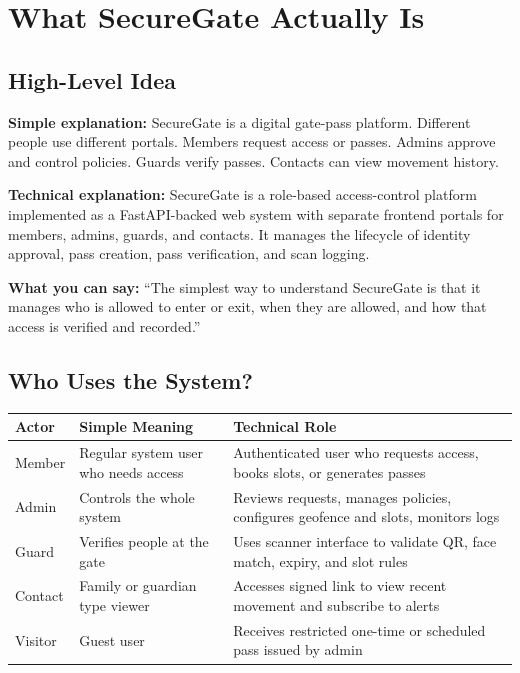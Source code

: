 \documentclass[12pt,letterpaper]{article}
\newcommand{\simple}[1]{\textbf{Simple explanation:} #1}
\newcommand{\technical}[1]{\textbf{Technical explanation:} #1}
\newcommand{\say}[1]{\textbf{What you can say:} ``#1''}
\begin{document}
\section{What SecureGate Actually Is}

\subsection{High-Level Idea}

\simple{SecureGate is a digital gate-pass platform. Different people use different portals. Members request access or passes. Admins approve and control policies. Guards verify passes. Contacts can view movement history.}

\technical{SecureGate is a role-based access-control platform implemented as a FastAPI-backed web system with separate frontend portals for members, admins, guards, and contacts. It manages the lifecycle of identity approval, pass creation, pass verification, and scan logging.}

\say{The simplest way to understand SecureGate is that it manages who is allowed to enter or exit, when they are allowed, and how that access is verified and recorded.}

\subsection{Who Uses the System?}

\begin{tabularx}{\textwidth}{@{}L{2.4cm}Y Y@{}}
\toprule
\textbf{Actor} & \textbf{Simple Meaning} & \textbf{Technical Role} \\
\midrule
Member & Regular system user who needs access & Authenticated user who requests access, books slots, or generates passes \\
Admin & Controls the whole system & Reviews requests, manages policies, configures geofence and slots, monitors logs \\
Guard & Verifies people at the gate & Uses scanner interface to validate QR, face match, expiry, and slot rules \\
Contact & Family or guardian type viewer & Accesses signed link to view recent movement and subscribe to alerts \\
Visitor & Guest user & Receives restricted one-time or scheduled pass issued by admin \\
\bottomrule
\end{tabularx}
\end{document}
